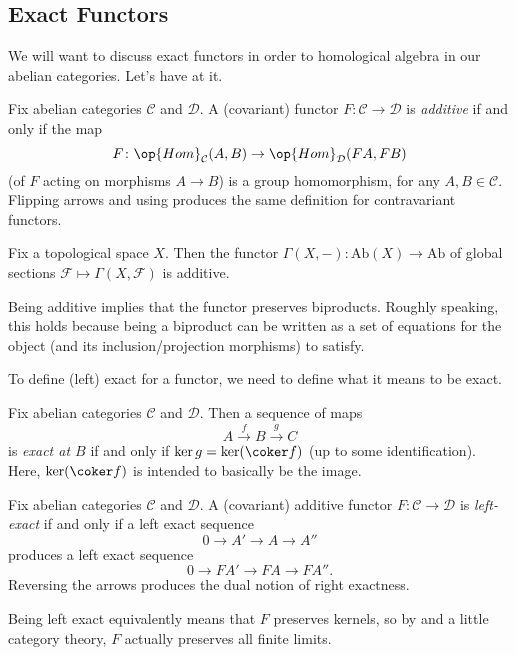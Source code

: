 \documentclass[../notes.tex]{subfiles}
\begin{document}
\subsection{Exact Functors}
We will want to discuss exact functors in order to homological algebra in our abelian categories. Let's have at it.
\begin{definition}[additive]
	Fix abelian categories $\mathcal C$ and $\mathcal D$. A (covariant) functor $F\colon\mathcal C\to\mathcal D$ is \textit{additive} if and only if the map
	\[F\colon\op{Hom}_\mathcal C(A,B)\to\op{Hom}_\mathcal D(FA,FB)\]
	(of $F$ acting on morphisms $A\to B$) is a group homomorphism, for any $A,B\in\mathcal C$. Flipping arrows and using  produces the same definition for contravariant functors.
\end{definition}
\begin{example} \label{ex:global-sections-functor}
	Fix a topological space $X$. Then the functor $\Gamma(X,-)\colon\mathrm{Ab}(X)\to\mathrm{Ab}$ of global sections $\mathcal F\mapsto\Gamma(X,\mathcal F)$ is additive.
\end{example}
\begin{remark} \label{rem:additive-preserves-biprod}
	Being additive implies that the functor preserves biproducts. Roughly speaking, this holds because being a biproduct can be written as a set of equations for the object (and its inclusion/projection morphisms) to satisfy.
\end{remark}
To define (left) exact for a functor, we need to define what it means to be exact.
\begin{definition}[exact]
	Fix abelian categories $\mathcal C$ and $\mathcal D$. Then a sequence of maps
	\[A\stackrel f\to B\stackrel g\to C\]
	is \textit{exact at $B$} if and only if $\ker g=\ker(\coker f)$ (up to some identification). Here, $\ker(\coker f)$ is intended to basically be the image.
\end{definition}
\begin{defihelper}
	Fix abelian categories $\mathcal C$ and $\mathcal D$. A (covariant) additive functor $F\colon\mathcal C\to\mathcal D$ is \textit{left-exact} if and only if a left exact sequence
	\[0\to A'\to A\to A''\]
	produces a left exact sequence
	\[0\to FA'\to FA\to FA''.\]
	Reversing the arrows produces the dual notion of right exactness.
\end{defihelper}
\begin{remark}
	Being left exact equivalently means that $F$ preserves kernels, so by  and a little category theory, $F$ actually preserves all finite limits.
\end{remark}
\end{document}

